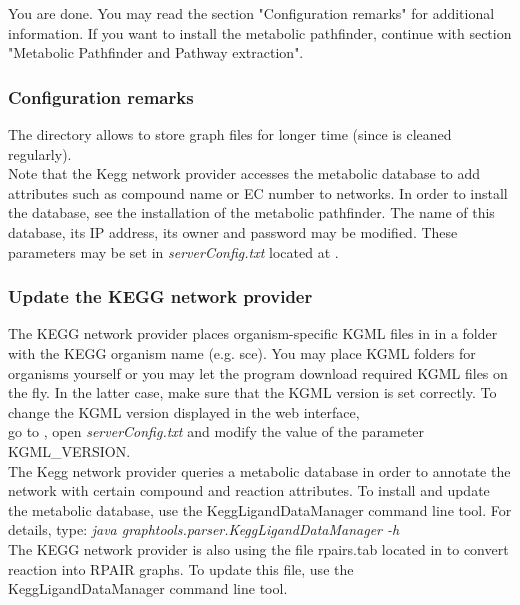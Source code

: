 \documentclass{book}
\begin{document}
You are done. You may read the section "Configuration remarks" for additional information.
If you want to install the metabolic pathfinder, continue with section "Metabolic Pathfinder and Pathway extraction".

\subsubsection{Configuration remarks}

The directory 
allows to store graph files for longer time
(since  is cleaned regularly).\\

Note that the Kegg network provider accesses the metabolic database to add attributes
such as compound name or EC number to networks.
In order to install the database, see the installation of the metabolic pathfinder.
The name of this database, its IP address, its owner and password may be modified.
These parameters may be set in \textit{serverConfig.txt}
located at .

\subsubsection{Update the KEGG network provider}

The KEGG network provider places organism-specific KGML files in 
in a folder with the KEGG organism name (e.g. sce).
You may place KGML folders for organisms yourself or you may let the program download
required KGML files on the fly. In the latter case, make sure that the KGML version is set correctly.
To change the KGML version displayed in the web interface,\\
go to , open
\textit{serverConfig.txt} and modify the value of the parameter KGML\_VERSION.\\

The Kegg network provider queries a metabolic database in order to annotate the network
with certain compound and reaction attributes.
To install and update the metabolic database, use the KeggLigandDataManager command line tool.
For details, type:
\textit{java graphtools.parser.KeggLigandDataManager -h}\\

The KEGG network provider is also using the file rpairs.tab located in 
to convert reaction into RPAIR graphs. To update this file, use the KeggLigandDataManager command line tool.\\
\end{document}
